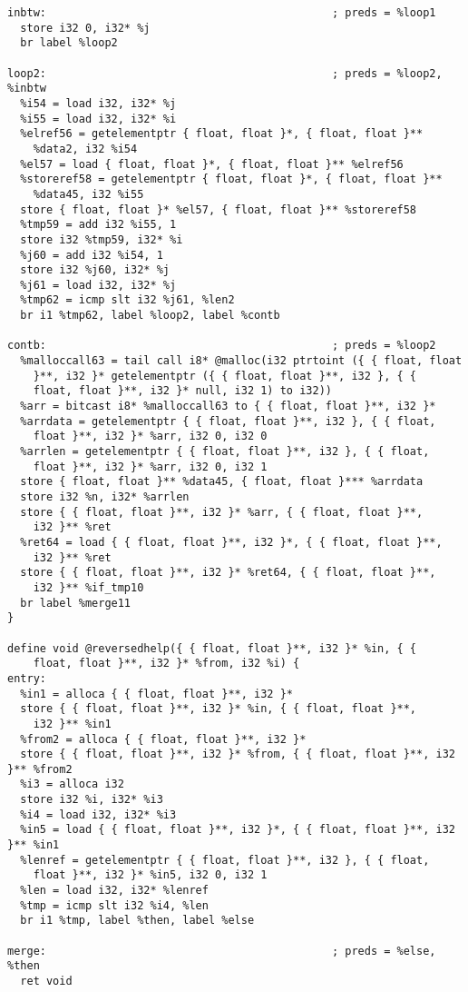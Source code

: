 \documentclass[main.tex]{subfiles}
\begin{document}
{\begin{lstlisting}
inbtw:                                            ; preds = %loop1
  store i32 0, i32* %j
  br label %loop2

loop2:                                            ; preds = %loop2, %inbtw
  %i54 = load i32, i32* %j
  %i55 = load i32, i32* %i
  %elref56 = getelementptr { float, float }*, { float, float }**
    %data2, i32 %i54
  %el57 = load { float, float }*, { float, float }** %elref56
  %storeref58 = getelementptr { float, float }*, { float, float }**
    %data45, i32 %i55
  store { float, float }* %el57, { float, float }** %storeref58
  %tmp59 = add i32 %i55, 1
  store i32 %tmp59, i32* %i
  %j60 = add i32 %i54, 1
  store i32 %j60, i32* %j
  %j61 = load i32, i32* %j
  %tmp62 = icmp slt i32 %j61, %len2
  br i1 %tmp62, label %loop2, label %contb

contb:                                            ; preds = %loop2
  %malloccall63 = tail call i8* @malloc(i32 ptrtoint ({ { float, float
    }**, i32 }* getelementptr ({ { float, float }**, i32 }, { { 
    float, float }**, i32 }* null, i32 1) to i32))
  %arr = bitcast i8* %malloccall63 to { { float, float }**, i32 }*
  %arrdata = getelementptr { { float, float }**, i32 }, { { float,
    float }**, i32 }* %arr, i32 0, i32 0
  %arrlen = getelementptr { { float, float }**, i32 }, { { float, 
    float }**, i32 }* %arr, i32 0, i32 1
  store { float, float }** %data45, { float, float }*** %arrdata
  store i32 %n, i32* %arrlen
  store { { float, float }**, i32 }* %arr, { { float, float }**, 
    i32 }** %ret
  %ret64 = load { { float, float }**, i32 }*, { { float, float }**,
    i32 }** %ret
  store { { float, float }**, i32 }* %ret64, { { float, float }**,
    i32 }** %if_tmp10
  br label %merge11
}

define void @reversedhelp({ { float, float }**, i32 }* %in, { {
    float, float }**, i32 }* %from, i32 %i) {
entry:
  %in1 = alloca { { float, float }**, i32 }*
  store { { float, float }**, i32 }* %in, { { float, float }**,
    i32 }** %in1
  %from2 = alloca { { float, float }**, i32 }*
  store { { float, float }**, i32 }* %from, { { float, float }**, i32 }** %from2
  %i3 = alloca i32
  store i32 %i, i32* %i3
  %i4 = load i32, i32* %i3
  %in5 = load { { float, float }**, i32 }*, { { float, float }**, i32 }** %in1
  %lenref = getelementptr { { float, float }**, i32 }, { { float,
    float }**, i32 }* %in5, i32 0, i32 1
  %len = load i32, i32* %lenref
  %tmp = icmp slt i32 %i4, %len
  br i1 %tmp, label %then, label %else

merge:                                            ; preds = %else, %then
  ret void


\end{lstlisting}}
\end{document}
